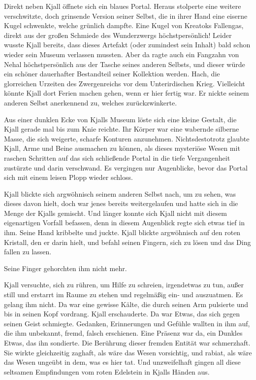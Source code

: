 Direkt neben Kjall öffnete sich ein blaues Portal. Heraus stolperte eine weitere verschwitzte, doch grinsende Version seiner Selbst, die in ihrer Hand eine eiserne Kugel schwenkte, welche grünlich dampfte. Eine Kugel von Kreatoks Fallengas, direkt aus der großen Schmiede des Wunderzwergs höchstpersönlich! Leider wusste Kjall bereits, dass dieses Artefakt (oder zumindest sein Inhalt) bald schon wieder sein Museum verlassen mussten. Aber da ragte auch ein Fangzahn von Nehal höchstpersönlich aus der Tasche seines anderen Selbsts, und dieser würde ein schöner dauerhafter Bestandteil seiner Kollektion werden. Hach, die glorreichen Urzeiten des Zwergenreichs vor dem Unterirdischen Krieg. Vielleicht könnte Kjall dort Ferien machen gehen, wenn er hier fertig war. Er nickte seinem anderen Selbst anerkennend zu, welches zurückzwinkerte.

Aus einer dunklen Ecke von Kjalls Museum löste sich eine kleine Gestalt, die Kjall gerade mal bis zum Knie reichte. Ihr Körper war eine wabernde silberne Masse, die sich weigerte, scharfe Konturen anzunehmen. Nichtsdestotrotz glaubte Kjall, Arme und Beine ausmachen zu können, als dieses mysteriöse Wesen mit raschen Schritten auf das sich schließende Portal in die tiefe Vergangenheit zustürzte und darin verschwand. Es vergingen nur Augenblicke, bevor das Portal sich mit einem leisen Plopp wieder schloss.

Kjall blickte sich argwöhnisch seinem anderen Selbst nach, um zu sehen, was dieses davon hielt, doch war jenes bereits weitergelaufen und hatte sich in die Menge der Kjalls gemischt. Und länger konnte sich Kjall nicht mit diesem eigenartigen Vorfall befassen, denn in diesem Augenblick regte sich etwas tief in ihm. Seine Hand kribbelte und juckte. Kjall blickte argwöhnisch auf den roten Kristall, den er darin hielt, und befahl seinen Fingern, sich zu lösen und das Ding fallen zu lassen.

Seine Finger gehorchten ihm nicht mehr.

Kjall versuchte, sich zu rühren, um Hilfe zu schreien, irgendetwas zu tun, außer still und erstarrt im Raume zu stehen und regelmäßig ein- und auszuatmen. Es gelang ihm nicht. Da war eine gewisse Kälte, die durch seinen Arm pulsierte und bis in seinen Kopf vordrang. Kjall erschauderte. Da war Etwas, das sich gegen seinen Geist schmiegte. Gedanken, Erinnerungen und Gefühle wallten in ihm auf, die ihm unbekannt, fremd, falsch erschienen. Eine Präsenz war da, ein Dunkles Etwas, das ihn sondierte. Die Berührung dieser fremden Entität war schmerzhaft. Sie wirkte gleichzeitig zaghaft, als wäre das Wesen vorsichtig, und rabiat, als wäre das Wesen ungeübt in dem, was es hier tat. Und unzweifelhaft gingen all diese seltsamen Empfindungen vom roten Edelstein in Kjalls Händen aus.


